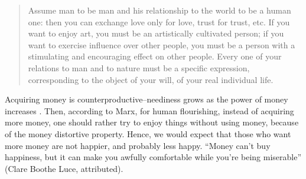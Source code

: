 \documentclass[10pt, letterpaper]{article}
\begin{document}
\begin{spacing}{1.8}
\begin{quote}
Assume man to be man and his relationship to the world to be a human one: then you can exchange love only for love, trust for trust, etc. If you want to enjoy art, you must be an artistically cultivated person; if you want to exercise influence over other people, you must be a person with a stimulating and encouraging effect on other people. Every one of your relations to man and to nature must be a specific expression, corresponding to the object of your will, of your real individual life.
\end{quote}

Acquiring money is counterproductive--neediness grows as the power of
money increases \citep{marx1844-human-requirements}.
%
Then, according to Marx, for human flourishing, instead of acquiring more money,
one should rather try to enjoy things without using money, because of the money
distortive property. Hence, we would expect that those who want more money are
not happier, and probably less happy.
%
``Money can't buy happiness, but it can make you awfully comfortable while you're
being miserable'' (Clare Boothe Luce, attributed).



\end{spacing}
\end{document}
